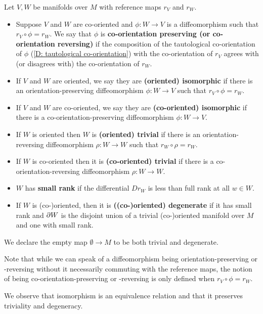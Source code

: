 \begin{definition}\label{D: equiv triv and small}
	Let $V, W$ be manifolds over $M$ with reference maps $r_V$ and $r_W$.
	\begin{itemize}
		\item Suppose $V$ and $W$ are co-oriented and $\phi \colon W \to V$ is a diffeomorphism such that $r_V \circ \phi = r_W$.
		We say that $\phi$ is \textbf{co-orientation preserving (or co-orientation reversing)} if the composition of the tautological co-orientation of $\phi$ (\cref{D: tautological co-orientation}) with the co-orientation of $r_V$ agrees with (or disagrees with) the co-orientation of $r_W$.
		\item If $V$ and $W$ are oriented, we say they are \textbf{(oriented) isomorphic} if there is an orientation-preserving diffeomorphism $\phi \colon W \to V$ such that $r_V \circ \phi = r_W$.
		\item If $V$ and $W$ are co-oriented, we say they are \textbf{(co-oriented) isomorphic} if there is a co-orientation-preserving diffeomorphism $\phi \colon W \to V$.
		\item If $W$ is oriented then $W$ is \textbf{(oriented) trivial} if there is an orientation-reversing diffeomorphism $\rho \colon W \to W$ such that $r_W \circ \rho = r_W$.
		\item If $W$ is co-oriented then it is \textbf{(co-oriented) trivial} if there is a co-orientation-reversing diffeomorphism $\rho \colon W \to W$.
		\item $W$ has \textbf{small rank} if the differential $D r_W$ is less than full rank at all $w\in W$.
		\item If $W$ is (co\nobreakdash-)oriented, then it is \textbf{((co\nobreakdash-)oriented) degenerate} if it has small rank and ${\partial W}$ is the disjoint union of a trivial (co\nobreakdash-)oriented manifold over $M$ and one with small rank.
	\end{itemize}
	We declare the empty map $\emptyset \to M$ to be both trivial and degenerate.
\end{definition}

Note that while we can speak of a diffeomorphism being orientation-preserving or -reversing without it necessarily commuting with the reference maps, the notion of being co-orientation-preserving or -reversing is only defined when $r_V \circ \phi = r_W$.

We observe that isomorphism is an equivalence relation and that it preserves triviality and degeneracy.

